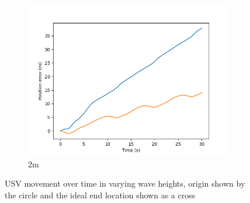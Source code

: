 \documentclass[class=article, crop=false]{standalone}
\begin{document}
\begin{figure}
\begin{subfigure}[b]{0.48\textwidth}
        \includegraphics{scenario1/rov-50m/2.0m/usv_pos_error_uncontrolled}
        \caption{2m}
        \label{}
    \end{subfigure}
    \caption{USV movement over time in varying wave heights, origin shown by the circle and the ideal end location shown as a cross}
    \label{}
\end{figure}
\end{document}
